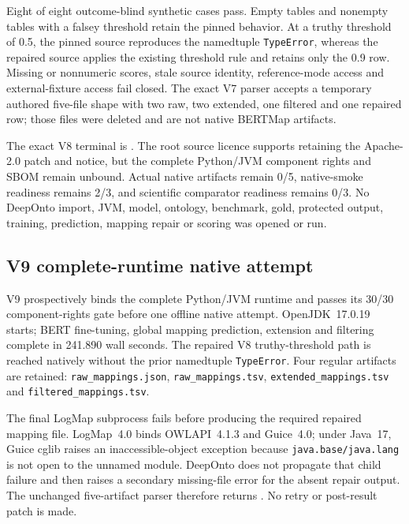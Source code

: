 Eight of eight outcome-blind synthetic cases pass. Empty tables and nonempty
tables with a falsey threshold retain the pinned behavior. At a truthy
threshold of 0.5, the pinned source reproduces the namedtuple
\texttt{TypeError}, whereas the repaired source applies the existing threshold
rule and retains only the 0.9 row. Missing or nonnumeric scores, stale source
identity, reference-mode access and external-fixture access fail closed. The
exact V7 parser accepts a temporary authored five-file shape with two raw, two
extended, one filtered and one repaired row; those files were deleted and are
not native BERTMap artifacts.

The exact V8 terminal is
.
The root source licence supports retaining the Apache-2.0 patch and notice, but
the complete Python/JVM component rights and SBOM remain unbound. Actual native
artifacts remain 0/5, native-smoke readiness remains 2/3, and scientific
comparator readiness remains 0/3. No DeepOnto import, JVM, model, ontology,
benchmark, gold, protected output, training, prediction, mapping repair or
scoring was opened or run.

\subsection{V9 complete-runtime native attempt}

V9 prospectively binds the complete Python/JVM runtime and passes its 30/30
component-rights gate before one offline native attempt. OpenJDK~17.0.19 starts;
BERT fine-tuning, global mapping prediction, extension and filtering complete in
241.890 wall seconds. The repaired V8 truthy-threshold path is reached natively
without the prior namedtuple \texttt{TypeError}. Four regular artifacts are
retained: \texttt{raw\_mappings.json}, \texttt{raw\_mappings.tsv},
\texttt{extended\_mappings.tsv} and \texttt{filtered\_mappings.tsv}.

The final LogMap subprocess fails before producing the required repaired
mapping file. LogMap~4.0 binds OWLAPI~4.1.3 and Guice~4.0;
under Java~17, Guice cglib raises an inaccessible-object exception because
\texttt{java.base/}\allowbreak\texttt{java.lang} is
not open to the unnamed module. DeepOnto does not propagate that child failure
and then raises a secondary missing-file error for the absent repair
output. The unchanged five-artifact parser therefore returns
. No retry or post-result
patch is made.

